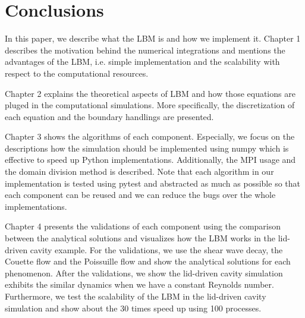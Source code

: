\chapter{Conclusions}
In this paper, we describe what the LBM is
and how we implement it.
Chapter 1 describes the motivation behind the numerical integrations
and mentions the advantages of the LBM, i.e.
simple implementation and the scalability with respect to the computational
resources.

Chapter 2 explains the theoretical aspects of LBM
and how those equations are pluged in the computational simulations.
More specifically, the discretization of each equation and
the boundary handlings are presented.

Chapter 3 shows the algorithms of each component.
Especially, we focus on the descriptions how
the simulation should be implemented using numpy
which is effective to speed up Python implementations.
Additionally, the MPI usage and the domain division method
is described. 
Note that each algorithm in our implementation
is tested using pytest and abstracted as much as possible
so that each component can be reused and we can reduce
the bugs over the whole implementations.

Chapter 4 presents the validations of each component
using the comparison between the analytical solutions
and visualizes how the LBM works in the lid-driven cavity
example.
For the validations, we use the shear wave decay, 
the Couette flow and the Poissuille flow
and show the analytical solutions for each phenomenon.
After the validations, we show the lid-driven cavity simulation
exhibits the similar dynamics when we have a constant Reynolds number.
Furthermore, we test the scalability of the LBM in the lid-driven cavity simulation
and show about the 30 times speed up using 100 processes.
